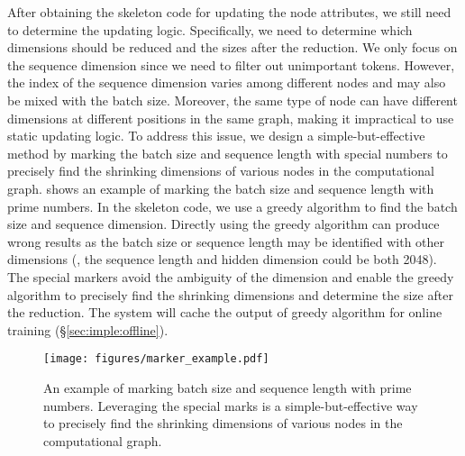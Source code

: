 After obtaining the skeleton code for updating the node attributes, we still need to determine the updating logic. Specifically, we need to determine which dimensions should be reduced and the sizes after the reduction. We only focus on the sequence dimension since we need to filter out unimportant tokens. However, the index of the sequence dimension varies among different nodes and may also be mixed with the batch size. Moreover, the same type of node can have different dimensions at different positions in the same graph, making it impractical to use static updating logic. To address this issue, we design a simple-but-effective method by marking the batch size and sequence length with special numbers to precisely find the shrinking dimensions of various nodes in the computational graph.  shows an example of marking the batch size and sequence length with prime numbers. 
In the skeleton code, we use a greedy algorithm to find the batch size and sequence dimension. Directly using the greedy algorithm can produce wrong results as the batch size or sequence length may be identified with other dimensions (\eg, the sequence length and hidden dimension could be both 2048). The special markers avoid the ambiguity of the dimension and enable the greedy algorithm to precisely find the shrinking dimensions and determine the size after the reduction. The system will cache the output of greedy algorithm for online training (\S\ref{sec:imple:offline}).


\begin{figure}[t!]
	\centering
	\texttt{[image: figures/marker\_example.pdf]}
	\caption{An example of marking batch size and sequence length with prime numbers. Leveraging the special marks is a simple-but-effective way to precisely find the shrinking dimensions of various nodes in the computational graph.} 
	\label{fig:marker_example}
    \vspace{+2mm}
\end{figure}
